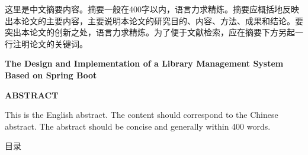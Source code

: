 \documentclass[a4paper,12pt,openany,twoside]{ctexbook}
\newcommand{\thesistitleEN}{The Design and Implementation of a Library Management System Based on Spring Boot}
\begin{document}
{\songti{}\setlength{\baselineskip}{20pt}
\setlength{\parindent}{2em}
\indent 这里是中文摘要内容。摘要一般在400字以内，语言力求精炼。摘要应概括地反映出本论文的主要内容，主要说明本论文的研究目的、内容、方法、成果和结论。要突出本论文的创新之处，语言力求精炼。为了便于文献检索，应在摘要下方另起一行注明论文的关键词。
}

\vspace{0.35\baselineskip}

\clearpage

\thispagestyle{frontmatterstyle}
{\centering\bfseries{}\thesistitleEN\par}
{\centering\bfseries{}ABSTRACT\par}

{\setlength{\baselineskip}{20pt}
\hspace{4ex}This is the English abstract. The content should correspond to the Chinese abstract. The abstract should be concise and generally within 400 words.
}

\vspace{0.35\baselineskip}

\clearpage

\thispagestyle{frontmatterstyle}
{\centering\heiti{}目\hspace{1em}录\par}
{\linespread{1.5}\selectfont
\makeatletter
{}
\makeatother
}
\clearpage

\mainmatter
\pagestyle{fancy}  %
\setcounter{page}{1}  %
\end{document}
